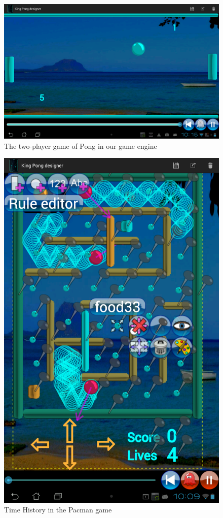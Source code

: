 \documentclass[12pt]{article} %
\begin{document}
\begin{figure}[h]
\centering
\includegraphics[width=5in]{captures/PongGame}
\caption{The two-player game of Pong in our game engine\label{ponggame}}
\end{figure}
\begin{figure}
\includegraphics[width=5in]{captures/PacmanGhostMode}
\caption{Time History in the Pacman game\label{pacman}}
\end{figure}
\end{document}
